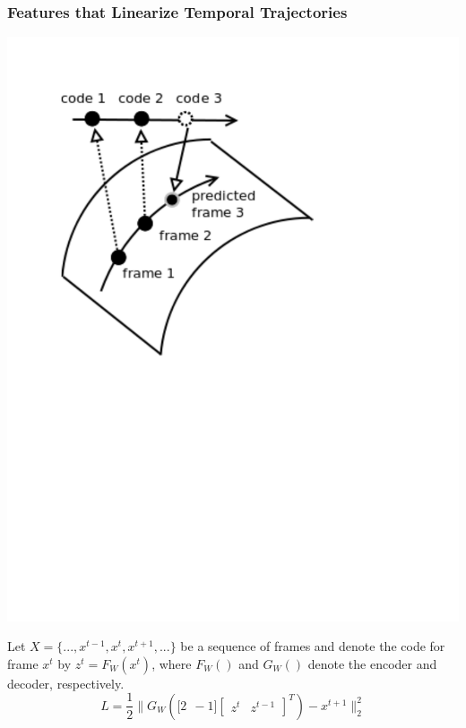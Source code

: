 \documentclass{beamer}
\begin{document}
\begin{frame} 
\frametitle{Features that Linearize Temporal Trajectories}
\begin{center} 
\includegraphics[scale=0.27, trim= 15 350 200 39, clip]{./Figures/Project2/linearize_manifold.pdf} 
\end{center} 
Let $X = \{...,x^{t-1},x^t,x^{t+1},...\}$ be a sequence of frames and denote the code for frame $x^t$ by $z^t = F_W(x^t)$, 
where $F_W()$ and $G_W()$ denote the encoder and decoder, respectively. \\
\begin{equation}
\nonumber
L = \frac{1}{2}\| G_W(\mathbf [2 ~~-1] \begin{bmatrix}z^t&z^{t-1}\end{bmatrix}^T) - x^{t+1} \|^2_2
\label{eqn:loss} 
\end{equation} 
\vspace{0.430cm} 
\end{frame} 
\end{document}
